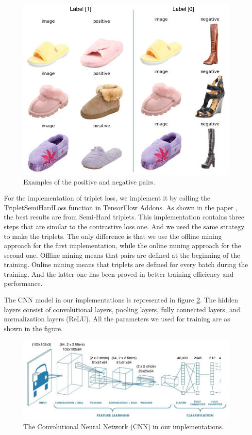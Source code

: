 \begin{figure}[h]
  \centering
  \includegraphics[width=0.9\linewidth]{figs/pairs.png}
  \caption{Examples of the positive and negative pairs.}
  \label{fig:pairs}
\end{figure}

For the implementation of triplet loss, we implement it by calling the TripletSemiHardLoss function in TensorFlow Addons. As shown in the paper \cite{schroff2015facenet}, the best results are from Semi-Hard triplets. This implementation contains three steps that are similar to the contrastive loss one. And we used the same strategy to make the triplets. The only difference is that we use the offline mining approach for the first implementation, while the online mining approach for the second one. Offline mining means that pairs are defined at the beginning of the training. Online mining means that triplets are defined for every batch during the training. And the latter one has been proved in better training efficiency and performance.

The CNN model in our implementations is represented in figure \ref{fig:cnn}. The hidden layers consist of convolutional layers, pooling layers, fully connected layers, and normalization layers (ReLU). All the parameters we used for training are as shown in the figure.  

\begin{figure}[h]
 \centering
 \includegraphics[width=\linewidth]{figs/cnn.png}
 \caption{The Convolutional Neural Network (CNN) in our implementations.}
 \label{fig:cnn}
\end{figure}

